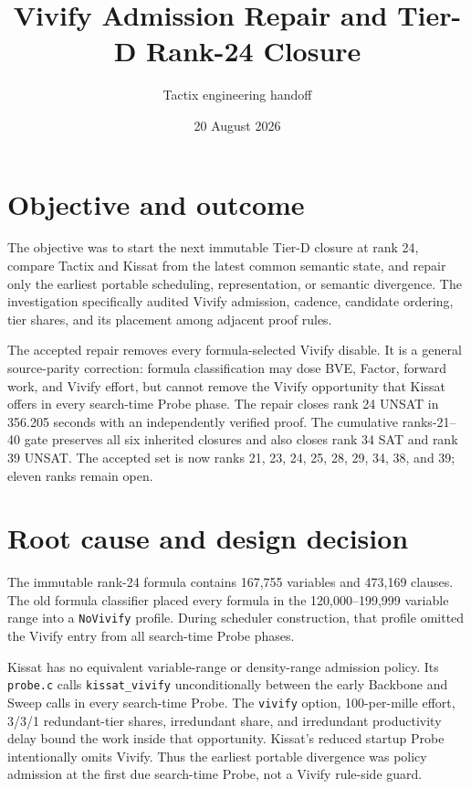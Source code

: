 \documentclass[11pt]{article}
\title{Vivify Admission Repair and Tier-D Rank-24 Closure}
\author{Tactix engineering handoff}
\date{20 August 2026}
\newcommand{\code}[1]{\texttt{#1}}
\begin{document}
\maketitle

\section*{Objective and outcome}
The objective was to start the next immutable Tier-D closure at rank 24,
compare Tactix and Kissat from the latest common semantic state, and repair
only the earliest portable scheduling, representation, or semantic
divergence.  The investigation specifically audited Vivify admission,
cadence, candidate ordering, tier shares, and its placement among adjacent
proof rules.

The accepted repair removes every formula-selected Vivify disable.  It is a
general source-parity correction: formula classification may dose BVE,
Factor, forward work, and Vivify effort, but cannot remove the Vivify
opportunity that Kissat offers in every search-time Probe phase.  The repair
closes rank 24 UNSAT in 356.205 seconds with an independently verified proof.
The cumulative ranks-21--40 gate preserves all six inherited closures and
also closes rank 34 SAT and rank 39 UNSAT.  The accepted set is now ranks 21,
23, 24, 25, 28, 29, 34, 38, and 39; eleven ranks remain open.

\section*{Root cause and design decision}
The immutable rank-24 formula contains 167,755 variables and 473,169 clauses.
The old formula classifier placed every formula in the 120,000--199,999
variable range into a \code{NoVivify} profile.  During scheduler construction,
that profile omitted the Vivify entry from all search-time Probe phases.

Kissat has no equivalent variable-range or density-range admission policy.
Its \code{probe.c} calls \code{kissat\_vivify} unconditionally between the
early Backbone and Sweep calls in every search-time Probe.  The
\code{vivify} option, 100-per-mille effort, 3/3/1 redundant-tier shares,
irredundant share, and irredundant productivity delay bound the work inside
that opportunity.  Kissat's reduced startup Probe intentionally omits
Vivify.  Thus the earliest portable divergence was policy admission at the
first due search-time Probe, not a Vivify rule-side guard.
\end{document}
